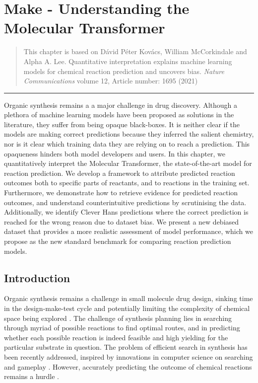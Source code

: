 \chapter{Make - Understanding the Molecular Transformer}\label{ch:transformer}

\begin{quote}
    This chapter is based on Dávid Péter Kovács, William McCorkindale and Alpha A. Lee. Quantitative interpretation explains machine learning models for chemical reaction prediction and uncovers bias. \textit{Nature Communications} volume 12, Article number: 1695 (2021)
\end{quote}

\noindent\hfil\rule{0.5\textwidth}{.4pt}\hfil

Organic synthesis remains a a major challenge in drug discovery. Although a plethora of machine learning models have been proposed as solutions in the literature, they suffer from being opaque black-boxes. It is neither clear if the models are making correct predictions because they inferred the salient chemistry, nor is it clear which training data they are relying on to reach a prediction. This opaqueness hinders both model developers and users. In this chapter, we quantitatively interpret the Molecular Transformer, the state-of-the-art model for reaction prediction. We develop a framework to attribute predicted reaction outcomes both to specific parts of reactants, and to reactions in the training set. Furthermore, we demonstrate how to retrieve evidence for predicted reaction outcomes, and understand counterintuitive predictions by scrutinising the data. Additionally, we identify Clever Hans predictions where the correct prediction is reached for the wrong reason due to dataset bias. We present a new debiased dataset that provides a more realistic assessment of model performance, which we propose as the new standard benchmark for comparing reaction prediction models.

\section{\label{sec:intro}Introduction}

Organic synthesis remains a challenge in small molecule drug design, sinking time in the design-make-test cycle and potentially limiting the complexity of chemical space being explored \cite{blakemore2018organic,bostrom2018expanding}. The challenge of synthesis planning lies in searching through myriad of possible reactions to find optimal routes, and in predicting whether each possible reaction is indeed feasible and high yielding for the particular substrate in question. The problem of efficient search in synthesis has been recently addressed, inspired by innovations in computer science on searching and gameplay \cite{segler2017neural,segler2018planning,kishimoto2019depth,schreck2019learning, segler2019world}. However, accurately predicting the outcome of chemical reactions remains a hurdle \cite{Coley2018, Johansson2020, Struble2020}.

